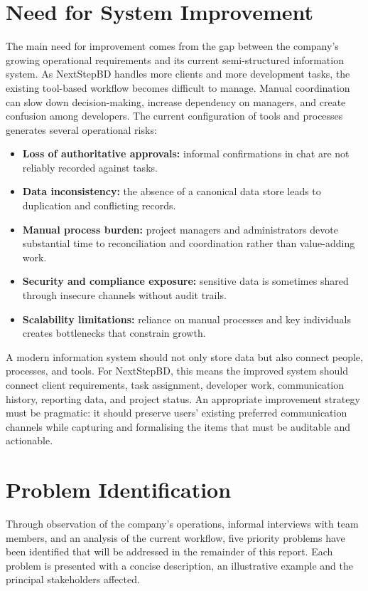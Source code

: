 \documentclass[12pt,a4paper]{report}
\begin{document}
\section{Need for System Improvement}
The main need for improvement comes from the gap between the company's growing operational requirements and its current semi-structured information system. As NextStepBD handles more clients and more development tasks, the existing tool-based workflow becomes difficult to manage. Manual coordination can slow down decision-making, increase dependency on managers, and create confusion among developers. The current configuration of tools and processes generates several operational risks:

\begin{itemize}[leftmargin=2em]
    \item \textbf{Loss of authoritative approvals:} informal confirmations in chat are not reliably recorded against tasks.
    \item \textbf{Data inconsistency:} the absence of a canonical data store leads to duplication and conflicting records.
    \item \textbf{Manual process burden:} project managers and administrators devote substantial time to reconciliation and coordination rather than value-adding work.
    \item \textbf{Security and compliance exposure:} sensitive data is sometimes shared through insecure channels without audit trails.
    \item \textbf{Scalability limitations:} reliance on manual processes and key individuals creates bottlenecks that constrain growth.
\end{itemize}

A modern information system should not only store data but also connect people, processes, and tools. For NextStepBD, this means the improved system should connect client requirements, task assignment, developer work, communication history, reporting data, and project status. An appropriate improvement strategy must be pragmatic: it should preserve users' existing preferred communication channels while capturing and formalising the items that must be auditable and actionable.

\section{Problem Identification}
Through observation of the company's operations, informal interviews with team members, and an analysis of the current workflow, five priority problems have been identified that will be addressed in the remainder of this report. Each problem is presented with a concise description, an illustrative example and the principal stakeholders affected.
\end{document}
